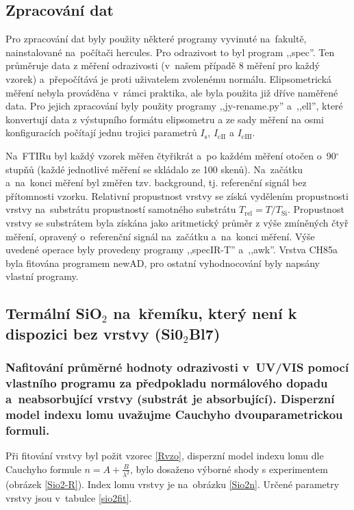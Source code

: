 \documentclass[12pt]{article}
\begin{document}
\subsection{Zpracování dat}
Pro zpracování dat byly použity některé programy vyvinuté na~fakultě, nainstalované na~počítači hercules. Pro odrazivost to byl program ,,spec''. Ten průměruje data z měření odrazivosti (v~našem případě 8 měření pro každý vzorek) a~přepočítává je proti uživatelem zvolenému normálu. Elipsometrická měření nebyla prováděna v~rámci praktika, ale byla použita již dříve naměřené data. Pro jejich zpracování byly použity programy ,,jy-rename.py'' a~,,ell'', které konvertují data z výstupního formátu elipsometru a ze sady měření na osmi konfiguracích počítají jednu trojici parametrů $I_\mathrm{s}$, $I_\mathrm{cII}$ a $I_\mathrm{cIII}$. 

Na~FTIRu byl každý vzorek měřen čtyřikrát a~po každém měření otočen o~90$^\circ$ stupňů (každé jednotlivé měření se skládalo ze 100 skenů). Na~začátku a~na~konci měření byl změřen tzv. background, tj. referenční signál bez přítomnosti vzorku. Relativní propustnost vrstvy se získá vydělením propustnosti vrstvy na~substrátu propustností samotného substrátu $T_\mathrm{rel} = T / T_\mathrm{Si}$. Propustnost vrstvy se substrátem byla získána jako aritmetický průměr z výše zmíněných čtyř měření, opravený o~referenční signál na~začátku a~na~konci měření. Výše uvedené operace byly provedeny programy ,,specIR-T'' a~,,awk''. Vrstva CH85a byla fitována programem newAD, pro ostatní vyhodnocování byly napsány vlastní programy. 


\subsection{Termální SiO$_2$ na~křemíku, který není k dispozici bez vrstvy (Si0$_2$Bl7)}
\subsubsection{Nafitování průměrné hodnoty odrazivosti v~UV/VIS pomocí vlastního programu za předpokladu normálového dopadu a~neabsorbující vrstvy (substrát je absorbující). Disperzní model indexu lomu uvažujme Cauchyho dvouparametrickou formuli. }

Při fitování vrstvy byl požit vzorec \ref{Rvzo}, disperzní model indexu lomu dle Cauchyho formule $n = A + \frac{B}{\lambda^2}$, bylo dosaženo výborné shody s experimentem (obrázek \ref{Sio2-R}). Index lomu vrstvy je na~obrázku \ref{Sio2n}. Určené parametry vrstvy jsou v~tabulce \ref{sio2fit}.
\end{document}
